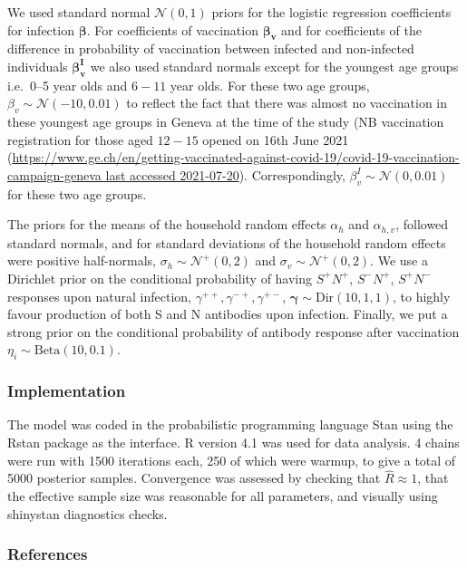 \documentclass{article}
\begin{document}
We used standard normal $\mathcal N(0,1)$ priors for the logistic
regression coefficients for infection $\boldsymbol{\beta}$. For
coefficients of vaccination $\boldsymbol{\beta_v}$ and for
coefficients of the difference in probability of vaccination between
infected and non-infected individuals $\boldsymbol{\beta_v^I}$ we also
used standard normals except for the youngest age groups i.e.~0--5 year
olds and $6-11$ year olds. For these two age groups,
$\beta_v \sim \mathcal N(-10,0.01)$ to reflect the fact that there was
almost no vaccination in these youngest age groups in Geneva at the time
of the study (NB vaccination registration for those aged $12-15$
opened on 16th June 2021
(\href{https://www.ge.ch/en/getting-vaccinated-against-covid-19/covid-19-vaccination-campaign-geneva}{https://www.ge.ch/en/getting-vaccinated-against-covid-19/covid-19-vaccination-campaign-geneva
last accessed 2021-07-20}).
Correspondingly, $\beta_v^I \sim \mathcal N(0,0.01)$ for these two age groups.

The priors for the means of the household random effects $\alpha_h$
and $\alpha_{h,v}$, followed standard normals, and for standard
deviations of the household random effects were positive half-normals,
$\sigma_h \sim \mathcal N^+(0, 2)$ and
$\sigma_v \sim \mathcal N^+(0, 2)$.
We use a Dirichlet prior on the conditional
probability of having $S^+N^+$, $S^-N^+$, $S^+N^-$ responses upon natural infection,
$\gamma^{++}, \gamma^{-+}, \gamma^{+-}$,
$\boldsymbol{\gamma} \sim \text{Dir}(10,1,1)$, to highly favour
production of both S and N antibodies upon infection. Finally, we put a
strong prior on the conditional probability of antibody response after
vaccination $\eta_i \sim \text{Beta}(10, 0.1)$.

\hypertarget{implementation}{%
\subsubsection*{Implementation}\label{implementation}}

The model was coded in the probabilistic programming language Stan \cite{stan} using the Rstan package \cite{rstan} as the interface.
R \cite{Rcore} version 4.1 was used for data analysis.
4 chains were run with 1500 iterations each, 250 of which were warmup, to give a total of 5000 posterior samples.
Convergence was assessed by checking that $\widehat{R} \approx 1$, that the effective sample size was reasonable for all parameters, and visually using shinystan \cite{shinystan} diagnostics checks.

\hypertarget{refs}{%
\subsubsection*{References}\label{refs}}

\printbibliography[heading=none]
\end{document}
